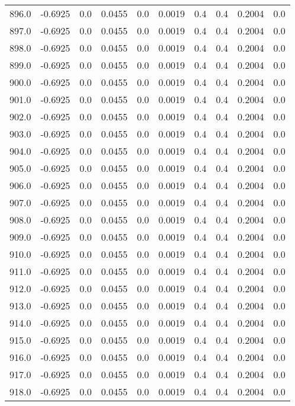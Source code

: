 \begin{longtable}{lrrrrrrrrr}
896.0 & -0.6925 & 0.0 & 0.0455 & 0.0 & 0.0019 & 0.4 & 0.4 & 0.2004 & 0.0 \\
897.0 & -0.6925 & 0.0 & 0.0455 & 0.0 & 0.0019 & 0.4 & 0.4 & 0.2004 & 0.0 \\
898.0 & -0.6925 & 0.0 & 0.0455 & 0.0 & 0.0019 & 0.4 & 0.4 & 0.2004 & 0.0 \\
899.0 & -0.6925 & 0.0 & 0.0455 & 0.0 & 0.0019 & 0.4 & 0.4 & 0.2004 & 0.0 \\
900.0 & -0.6925 & 0.0 & 0.0455 & 0.0 & 0.0019 & 0.4 & 0.4 & 0.2004 & 0.0 \\
901.0 & -0.6925 & 0.0 & 0.0455 & 0.0 & 0.0019 & 0.4 & 0.4 & 0.2004 & 0.0 \\
902.0 & -0.6925 & 0.0 & 0.0455 & 0.0 & 0.0019 & 0.4 & 0.4 & 0.2004 & 0.0 \\
903.0 & -0.6925 & 0.0 & 0.0455 & 0.0 & 0.0019 & 0.4 & 0.4 & 0.2004 & 0.0 \\
904.0 & -0.6925 & 0.0 & 0.0455 & 0.0 & 0.0019 & 0.4 & 0.4 & 0.2004 & 0.0 \\
905.0 & -0.6925 & 0.0 & 0.0455 & 0.0 & 0.0019 & 0.4 & 0.4 & 0.2004 & 0.0 \\
906.0 & -0.6925 & 0.0 & 0.0455 & 0.0 & 0.0019 & 0.4 & 0.4 & 0.2004 & 0.0 \\
907.0 & -0.6925 & 0.0 & 0.0455 & 0.0 & 0.0019 & 0.4 & 0.4 & 0.2004 & 0.0 \\
908.0 & -0.6925 & 0.0 & 0.0455 & 0.0 & 0.0019 & 0.4 & 0.4 & 0.2004 & 0.0 \\
909.0 & -0.6925 & 0.0 & 0.0455 & 0.0 & 0.0019 & 0.4 & 0.4 & 0.2004 & 0.0 \\
910.0 & -0.6925 & 0.0 & 0.0455 & 0.0 & 0.0019 & 0.4 & 0.4 & 0.2004 & 0.0 \\
911.0 & -0.6925 & 0.0 & 0.0455 & 0.0 & 0.0019 & 0.4 & 0.4 & 0.2004 & 0.0 \\
912.0 & -0.6925 & 0.0 & 0.0455 & 0.0 & 0.0019 & 0.4 & 0.4 & 0.2004 & 0.0 \\
913.0 & -0.6925 & 0.0 & 0.0455 & 0.0 & 0.0019 & 0.4 & 0.4 & 0.2004 & 0.0 \\
914.0 & -0.6925 & 0.0 & 0.0455 & 0.0 & 0.0019 & 0.4 & 0.4 & 0.2004 & 0.0 \\
915.0 & -0.6925 & 0.0 & 0.0455 & 0.0 & 0.0019 & 0.4 & 0.4 & 0.2004 & 0.0 \\
916.0 & -0.6925 & 0.0 & 0.0455 & 0.0 & 0.0019 & 0.4 & 0.4 & 0.2004 & 0.0 \\
917.0 & -0.6925 & 0.0 & 0.0455 & 0.0 & 0.0019 & 0.4 & 0.4 & 0.2004 & 0.0 \\
918.0 & -0.6925 & 0.0 & 0.0455 & 0.0 & 0.0019 & 0.4 & 0.4 & 0.2004 & 0.0 \\

\end{longtable}
